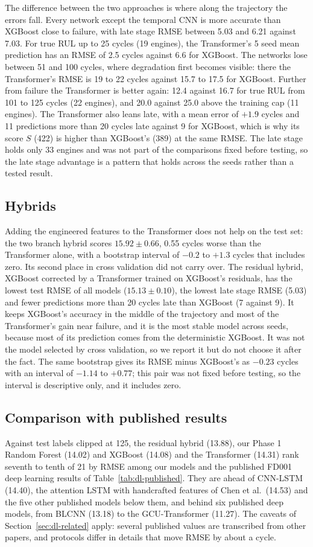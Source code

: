 The difference between the two approaches is where along the trajectory
the errors fall. Every network except the temporal CNN is more accurate than
XGBoost close to failure, with late stage RMSE between 5.03 and 6.21 against
7.03. For true RUL up to 25 cycles (19 engines), the Transformer's 5 seed
mean prediction has an RMSE of 2.5 cycles against 6.6 for XGBoost. The
networks lose between 51 and 100 cycles, where degradation first becomes
visible: there the Transformer's RMSE is 19 to 22 cycles against 15.7 to
17.5 for XGBoost. Further from failure the Transformer is better again: 12.4
against 16.7 for true RUL from 101 to 125 cycles (22 engines), and 20.0
against 25.0 above the training cap (11 engines). The Transformer also leans late, with a mean error of $+1.9$
cycles and 11 predictions more than 20 cycles late against 9 for XGBoost,
which is why its score $S$ (422) is higher than XGBoost's (389) at the same
RMSE. The late stage holds only 33 engines and was not part of the
comparisons fixed before testing, so the late stage advantage is a
pattern that holds across the seeds rather than a tested result.

\subsection{Hybrids}
Adding the engineered features to the Transformer does not help on the test
set: the two branch hybrid scores $15.92 \pm 0.66$, 0.55 cycles worse than
the Transformer alone, with a bootstrap interval of $-0.2$ to $+1.3$ cycles
that includes zero. Its second place in cross validation did not carry over.
The residual hybrid, XGBoost corrected by a Transformer trained on XGBoost's
residuals, has the lowest test RMSE of all models ($15.13 \pm 0.10$), the
lowest late stage RMSE (5.03) and fewer predictions more than 20 cycles
late than XGBoost (7 against 9). It keeps XGBoost's accuracy in the middle of the trajectory and
most of the Transformer's gain near failure, and it is the most stable model
across seeds, because most of its prediction comes from the deterministic
XGBoost. It was not the model selected by cross validation, so we report it
but do not choose it after the fact. The same bootstrap gives its RMSE minus
XGBoost's as $-0.23$ cycles with an interval of $-1.14$ to $+0.77$; this pair
was not fixed before testing, so the interval is descriptive only, and it
includes zero.

\subsection{Comparison with published results}
Against test labels clipped at 125, the residual hybrid (13.88), our Phase 1
Random Forest (14.02) and XGBoost (14.08) and the Transformer (14.31) rank
seventh to tenth of 21 by RMSE among our models and the published FD001
deep learning results of Table~\ref{tab:dl-published}. They are ahead of
CNN-LSTM (14.40), the attention LSTM with handcrafted features of Chen et
al.\ (14.53) and the five other published models below them, and behind six published deep
models, from BLCNN (13.18) to the GCU-Transformer (11.27). The caveats of
Section~\ref{sec:dl-related} apply: several published values are transcribed
from other papers, and protocols differ in details that move RMSE by about a
cycle.
